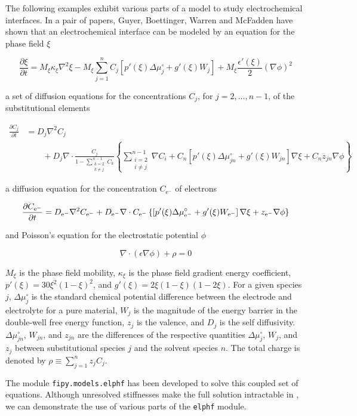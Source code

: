 The following examples exhibit various parts of a model to study
electrochemical interfaces.  In a pair of papers, Guyer, Boettinger, Warren
and McFadden \cite{ElPhFI,ElPhFII} have shown that an electrochemical
interface can be modeled by an equation for the phase field \( \xi \)

\[
    \frac{\partial \xi}{\partial t}
    = 
    M_{\xi}\kappa_{\xi}\nabla^2 \xi
    - 
    M_{\xi}\sum_{j=1}^{n} C_j \left[
	p'(\xi) \Delta\mu_j^\circ
	+ g'(\xi) W_j
    \right]
    +
    M_{\xi}\frac{\epsilon'(\xi)}{2}\left(\nabla\phi\right)^2
\]

a set of diffusion equations for the concentrations \( C_j \), for \(
j = 2,\ldots, n-1 \), of the substitutional elements

\begin{align*}
    \frac{\partial C_j}{\partial t}
    &= D_{j}\nabla^2 C_j \\
    & \qquad + 
	D_{j}\nabla\cdot 
	\frac{C_j}{1 - \sum_{\substack{k=2\\ k \neq j}}^{n-1} C_k}
	\left\{
	    \sum_{\substack{i=2\\ i \neq j}}^{n-1} \nabla C_i
	    + 
	    C_n \left[
		p'(\xi) \Delta\mu_{jn}^{\circ}
		+ g'(\xi) W_{jn}
	    \right] \nabla\xi
	    +
	    C_n z_{jn} \nabla \phi
	\right\}
\end{align*}

a diffusion equation for the concentration \( C_{\text{e}^{-}} \) of
electrons

\[
    \frac{\partial C_{\text{e}^{-}}}{\partial t}
    = D_{\text{e}^{-}}\nabla^2 C_{\text{e}^{-}} \\
    + D_{\text{e}^{-}}\nabla\cdot 
	C_{\text{e}^{-}}
	\left\{
	    \left[
		p'(\xi) \Delta\mu_{\text{e}^{-}}^{\circ}
		+ g'(\xi) W_{\text{e}^{-}}
	    \right] \nabla\xi
	    +
	    z_{\text{e}^{-}} \nabla \phi
	\right\}
\]

and Poisson's equation for the electrostatic potential \( \phi \)

\[ 
    \nabla\cdot\left(\epsilon\nabla\phi\right) 
    +
    \rho
    = 0
\]

\( M_\xi \) is the phase field mobility, \( \kappa_\xi \) is the phase
field gradient energy coefficient, \( p'(\xi) =
30\xi^2\left(1-\xi\right)^2 \), and \( g'(\xi) =
2\xi\left(1-\xi\right)\left(1-2\xi\right) \).  For a given species \(
j \), \( \Delta\mu_j^{\circ} \) is the standard chemical potential
difference between the electrode and electrolyte for a pure material,
\( W_j \) is the magnitude of the energy barrier in the double-well
free energy function, \( z_j \) is the valence, and \( D_{j} \) is the
self diffusivity.  \( \Delta\mu_{jn}^{\circ} \), \( W_{jn} \), and \(
z_{jn} \) are the differences of the respective quantities \(
\Delta\mu_{j}^{\circ} \), \( W_{j} \), and \( z_{j} \) between
substitutional species \( j \) and the solvent species \( n \).  The
total charge is denoted by \( \rho \equiv \sum_{j=1}^n z_j C_j \).

The module \verb+fipy.models.elphf+ has been developed to solve this
coupled set of equations.  Although unresolved stiffnesses make the
full solution intractable in \FiPy{}, we can demonstrate the use of
various parts of the \verb+elphf+ module.
